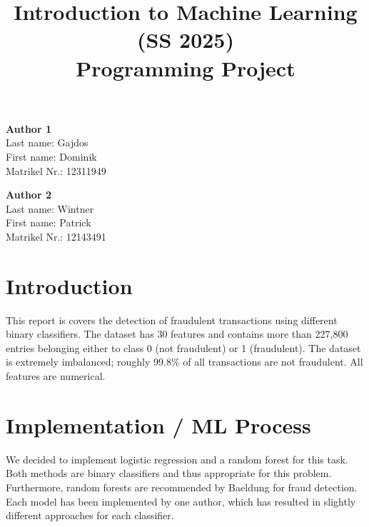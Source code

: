 \documentclass[a4, 10 pt, conference]{ieeeconf}  %
\title{\LARGE \bf
Introduction to Machine Learning (SS 2025)\\ Programming Project
\vspace{-3em}
}
\begin{document}
\maketitle
\vspace{-3em}
\thispagestyle{empty}
\pagestyle{empty}

\begin{strip}
\begin{tcolorbox}[
size=tight,
colback=white,
boxrule=0.2mm,
left=3mm,right=3mm, top=3mm, bottom=1mm
]
{\begin{multicols}{2}%

\textbf{Author 1}\\
Last name: Gajdos\\
First name: Dominik\\
Matrikel Nr.: 12311949\\  

\columnbreak

\textbf{Author 2}\\
Last name: Wintner\\
First name: Patrick\\
Matrikel Nr.: 12143491\\

\end{multicols}}
\end{tcolorbox}
\end{strip}


\section{Introduction}
\label{sec:intro}
This report is covers the detection of fraudulent transactions using different binary classifiers. The dataset has 30 features and contains more than 227,800 entries belonging either to class 0 (not fraudulent) or 1 (fraudulent). The dataset is extremely imbalanced; roughly 99.8\% of all transactions are not fraudulent. All features are numerical.

\section{Implementation / ML Process}
\label{sec:methods}
We decided to implement logistic regression and a random forest for this task. Both methods are binary classifiers and thus appropriate for this problem. Furthermore, random forests are recommended by Baeldung for fraud detection\cite{baeldung}. Each model has been implemented by one author, which has resulted in slightly different approaches for each classifier.
\end{document}
